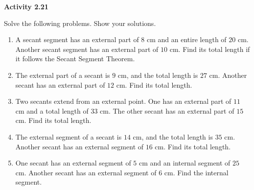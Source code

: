 \vspace{0.3ex}
\noindent\textbf{Activity 2.21}

\vspace{0.2ex}

Solve the following problems. Show your solutions.

\begin{enumerate}
    \item A secant segment has an external part of $8$ cm and an entire length of $20$ cm. Another secant segment has an external part of $10$ cm. Find its total length if it follows the Secant Segment Theorem.
    \item The external part of a secant is $9$ cm, and the total length is $27$ cm. Another secant has an external part of $12$ cm. Find its total length.
    \item Two secants extend from an external point. One has an external part of $11$ cm and a total length of $33$ cm. The other secant has an external part of $15$ cm. Find its total length.
    \item The external segment of a secant is $14$ cm, and the total length is $35$ cm. Another secant has an external segment of $16$ cm. Find its total length.
    \item One secant has an external segment of $5$ cm and an internal segment of $25$ cm. Another secant has an external segment of $6$ cm. Find the internal segment.
\end{enumerate}
